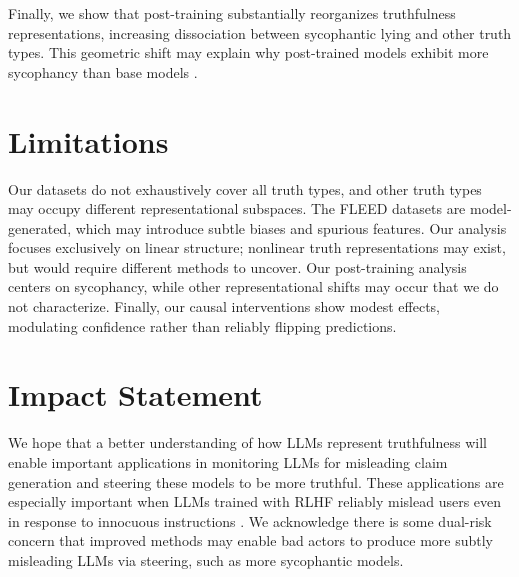 \documentclass{article}
\theoremstyle{plain}
\theoremstyle{definition}
\theoremstyle{remark}
\begin{document}
Finally, we show that post-training substantially reorganizes truthfulness representations, increasing dissociation between sycophantic lying and other truth types. This geometric shift may explain why post-trained models exhibit more sycophancy than base models \citep{wei2023simple, sharma2024towards}.

\section{Limitations}

Our datasets do not exhaustively cover all truth types, and other truth types may occupy different representational subspaces. The FLEED datasets are model-generated, which may introduce subtle biases and spurious features. Our analysis focuses exclusively on linear structure; nonlinear truth representations may exist, but would require different methods to uncover. Our post-training analysis centers on sycophancy, while other representational shifts may occur that we do not characterize. Finally, our causal interventions show modest effects, modulating confidence rather than reliably flipping predictions. 

\section*{Impact Statement}

We hope that a better understanding of how LLMs represent truthfulness will enable important applications in monitoring LLMs for misleading claim generation and steering these models to be more truthful. These applications are especially important when LLMs trained with RLHF reliably mislead users even in response to innocuous instructions \citep{AbdulhaiEtAl2025DeceptiveDialogue}. We acknowledge there is some dual-risk concern that improved methods may enable bad actors to produce more subtly misleading LLMs via steering, such as more sycophantic models.






\newpage
\appendix
\onecolumn
\label{appendix}
\end{document}
